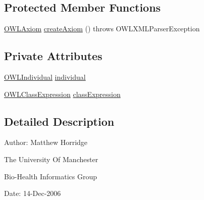 \subsection*{Protected Member Functions}
\begin{DoxyCompactItemize}
\item 
\hyperlink{interfaceorg_1_1semanticweb_1_1owlapi_1_1model_1_1_o_w_l_axiom}{O\-W\-L\-Axiom} \hyperlink{classorg_1_1coode_1_1owlapi_1_1owlxmlparser_1_1_o_w_l_class_assertion_axiom_element_handler_a10207b908ef989af1ba79096042774f4}{create\-Axiom} ()  throws O\-W\-L\-X\-M\-L\-Parser\-Exception 
\end{DoxyCompactItemize}
\subsection*{Private Attributes}
\begin{DoxyCompactItemize}
\item 
\hyperlink{interfaceorg_1_1semanticweb_1_1owlapi_1_1model_1_1_o_w_l_individual}{O\-W\-L\-Individual} \hyperlink{classorg_1_1coode_1_1owlapi_1_1owlxmlparser_1_1_o_w_l_class_assertion_axiom_element_handler_a0a84457512b396d8c0ed8e227c5d93f1}{individual}
\item 
\hyperlink{interfaceorg_1_1semanticweb_1_1owlapi_1_1model_1_1_o_w_l_class_expression}{O\-W\-L\-Class\-Expression} \hyperlink{classorg_1_1coode_1_1owlapi_1_1owlxmlparser_1_1_o_w_l_class_assertion_axiom_element_handler_ae231e6104b9cd2ad95ae27d11b48ff99}{class\-Expression}
\end{DoxyCompactItemize}


\subsection{Detailed Description}
Author\-: Matthew Horridge\par
 The University Of Manchester\par
 Bio-\/\-Health Informatics Group\par
 Date\-: 14-\/\-Dec-\/2006\par
\par
 

